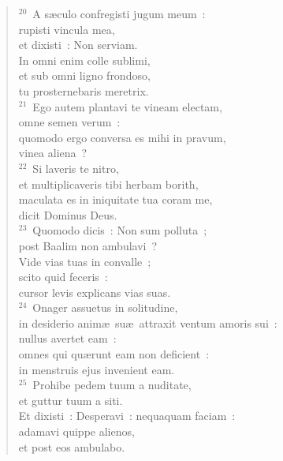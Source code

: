 \begin{flushleft}
\begin{verse}
${}^{20}$~A s\ae culo confregisti jugum meum~:\\ rupisti vincula mea,\\ et dixisti~: Non serviam.\\ In omni enim colle sublimi,\\ et sub omni ligno frondoso,\\ tu prosternebaris meretrix.\\
${}^{21}$~Ego autem plantavi te vineam electam,\\ omne semen verum~:\\ quomodo ergo conversa es mihi in pravum,\\ vinea aliena~?\\
${}^{22}$~Si laveris te nitro,\\ et multiplicaveris tibi herbam borith,\\ maculata es in iniquitate tua coram me,\\ dicit Dominus Deus.\\
${}^{23}$~Quomodo dicis~: Non sum polluta~;\\ post Baalim non ambulavi~?\\ Vide vias tuas in convalle~;\\ scito quid feceris~:\\ cursor levis explicans vias suas.\\
${}^{24}$~Onager assuetus in solitudine,\\ in desiderio anim\ae\ su\ae\ attraxit ventum amoris sui~:\\ nullus avertet eam~:\\ omnes qui qu\ae runt eam non deficient~:\\ in menstruis ejus invenient eam.\\
${}^{25}$~Prohibe pedem tuum a nuditate,\\ et guttur tuum a siti.\\ Et dixisti~: Desperavi~: nequaquam faciam~:\\ adamavi quippe alienos,\\ et post eos ambulabo.\end{verse}\end{flushleft}


